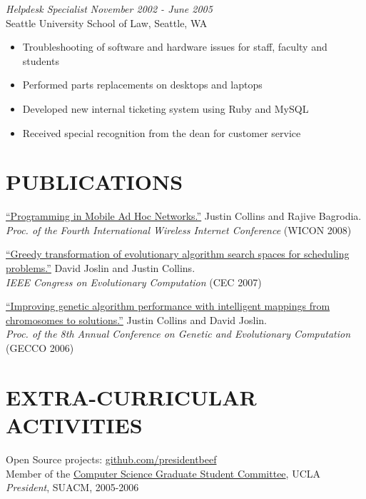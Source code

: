 \documentclass[margin]{res}
\begin{document}
\begin{resume}
		{\sl Helpdesk Specialist} \hfill \textit{November 2002 - June 2005} \\
                Seattle University School of Law, Seattle, WA 
                 \begin{itemize}  \itemsep -2pt %
                \item Troubleshooting of software and hardware issues for staff, faculty and students
		\item Performed parts replacements on desktops and laptops
		\item Developed new internal ticketing system using Ruby and MySQL
		\item Received special recognition from the dean for customer service
                \end{itemize}

\section{PUBLICATIONS}
		\href{http://cs.ucla.edu/~collins/documents/Justin_Collins-WICON08.pdf}{``Programming in Mobile Ad Hoc Networks.''} Justin Collins and Rajive Bagrodia. \\
		{\it Proc. of the Fourth International Wireless Internet Conference} (WICON 2008)

		\href{http://cs.ucla.edu/~collins/documents/Joslin_Collins-Greedy_Transformations_of_Search_Spaces.pdf}{``Greedy transformation of evolutionary algorithm search spaces for scheduling problems.''} David Joslin and Justin Collins.\\
		{\it IEEE Congress on Evolutionary Computation} (CEC 2007)

		\href{http://cs.ucla.edu/~collins/documents/Collins_Joslin-GECCO06-abstract.pdf}{``Improving genetic algorithm performance with intelligent mappings from chromosomes to solutions.''} Justin Collins and David Joslin. \\
		{\it Proc. of the 8th Annual Conference on Genetic and Evolutionary Computation} (GECCO 2006)

\section{EXTRA-CURRICULAR \\ ACTIVITIES}             
            Open Source projects: \href{http://github.com/presidentbeef}{github.com/presidentbeef}\\
	    Member of the \href{http://csgsc.cs.ucla.edu/}{Computer Science Graduate Student Committee}, UCLA \\
            {\it President}, SUACM, 2005-2006

\end{resume}
\end{document}
